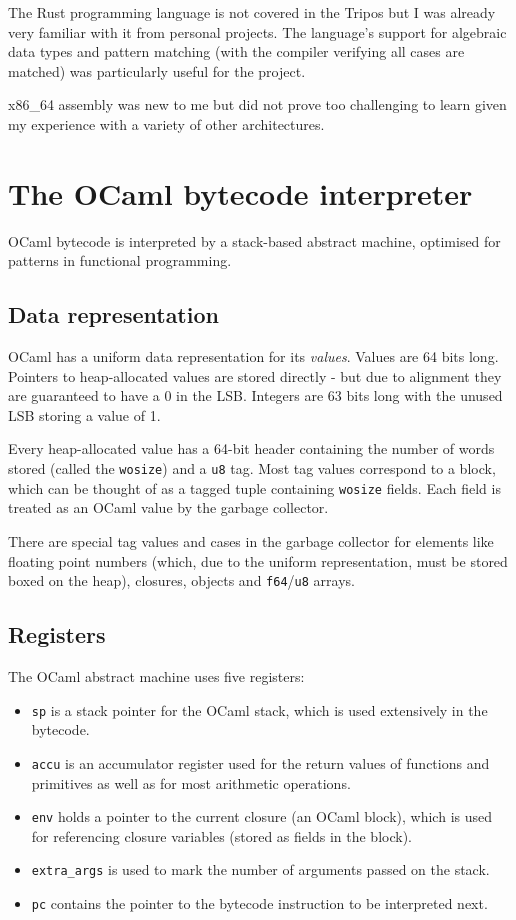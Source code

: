 The Rust programming language is not covered in the Tripos but I was already very familiar with
it from personal projects. The language's support for algebraic data types and pattern matching
(with the compiler verifying all cases are matched) was particularly useful for the project.

x86\_64 assembly was new to me but did not prove too challenging to learn given my experience with
a variety of other architectures.

\section{The OCaml bytecode interpreter}

OCaml bytecode is interpreted by a stack-based abstract machine, optimised for patterns in
functional programming.

\subsection{Data representation}

OCaml has a uniform data representation for its \emph{values}. Values are 64 bits long.
Pointers to heap-allocated values are stored directly - but due to alignment they are guaranteed to
have a 0 in
the LSB. Integers are 63 bits long with the unused LSB storing a value of 1.

Every heap-allocated value has a 64-bit header containing the number of words stored (called
the \texttt{wosize}) and a \texttt{u8} tag. Most tag values correspond to a block, which can be
thought of as a tagged tuple containing \texttt{wosize} fields. Each field is treated as an OCaml
value by the garbage collector.

There are special tag values and cases in the garbage collector for elements like floating point
numbers (which, due to the uniform representation, must be stored boxed on the heap),
closures, objects and \texttt{f64}/\texttt{u8} arrays.

\subsection{Registers}

The OCaml abstract machine uses five registers:

\begin{itemize}
    \item \texttt{sp} is a stack pointer for the OCaml stack, which is used extensively
          in the bytecode.
    \item \texttt{accu} is an accumulator register used for the return values of functions
          and primitives as well as for most arithmetic operations.
    \item \texttt{env} holds a pointer to the current closure (an OCaml block), which is used for
          referencing closure variables (stored as fields in the block).
    \item \texttt{extra\_args} is used to mark the number of arguments passed on the stack.
    \item \texttt{pc} contains the pointer to the bytecode instruction to be interpreted next.
\end{itemize}


